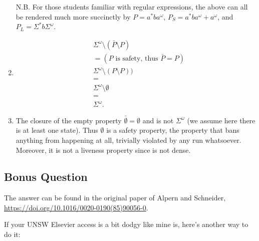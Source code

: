 \documentclass{article}
\begin{document}
\begin{enumerate}
{    N.B. For those students familiar with regular expressions, the above can
    all be rendered much more succinctly by
    $P = a^* b a^\omega$,
    $P_S = a^* b a^\omega + a^\omega$,
    and $P_L = \Sigma^* b \Sigma^\omega$.
  }
  \item {
    \begin{align*}
      &\Sigma^\omega \setminus (\bar{P} \setminus P) \\
      &= (\text{$P$ is safety, thus $\bar{P} = P$}) \\
      &\Sigma^\omega \setminus (P \setminus P)) \\
      &=\\
      &\Sigma^\omega \setminus \emptyset \\
      &=\\
      &\Sigma^\omega.
    \end{align*}
  }
  \item {
    The closure of the empty property $\bar{\emptyset} = \emptyset$ and is not
    $\Sigma^\omega$ (we assume here there is at least one state).
    Thus $\emptyset$ is a safety property, the property that bans anything from
    happening at all, trivially violated by any run whatsoever. Moreover, it is
    not a liveness property since is not dense.
  }
\end{enumerate}

\subsection{Bonus Question}

The answer can be found in the original paper of Alpern and Schneider,
\url{https://doi.org/10.1016/0020-0190(85)90056-0}.

If your UNSW Elsevier access is a bit dodgy like mine is, here's another way to do it:
\end{document}
